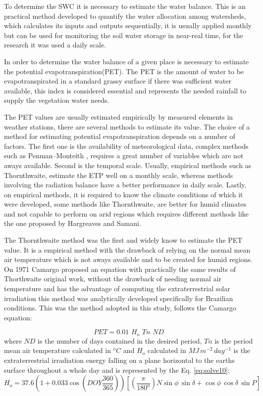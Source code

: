 To determine the SWC it is necessary to estimate the water balance. This is an practical method developed to quantify the water allocation among watersheds, which calculates its inputs and outputs sequentially, it is usually applied monthly but can be used for monitoring the soil water storage in near-real time\cite{thornthwaite1957instructions}, for the research it was used a daily scale.

In order to determine the water balance of a given place is necessary to estimate the potential evapotranspiration(PET). The PET is the amount of water to be evapotranspirated in a standard grassy surface if there was sufficient water available, this index is considered essential and represents the needed rainfall to supply the vegetation water needs\cite{de2000revisao}.

The PET values are usually estimated empirically by measured elements in weather stations, there are several methods to estimate its value. The choice of a method for estimating potential evapotranspiration depends on a number of factors. The first one is the availability of meteorological data, complex methods such as Penman–Monteith \cite{allen1998crop}, requires a great number of variables which are not aways available. Second is the temporal scale. Usually, empirical methods such as Thornthwaite, estimate the ETP well on a monthly scale, whereas methods involving the radiation balance have a better performance in daily scale. Lastly, on empirical methods, it is required to know the climate conditions of which it were developed, some methods like Thornthwaite, are better for humid climates and not capable to perform on arid regions which requires different methods like the one proposed by Hargreaves and Samani\cite{hargreaves1985reference}.

The Thornthwaite method \cite{thornthwaite1948approach} was the first and widely know to estimate the PET value. It is a empirical method with the drawback of relying on the normal mean air temperature which is not aways available and to be created for humid regions. On 1971 Camargo\cite{camargo1971paulo} proposed an equation with practically the same results of Thorthwaite original work, without the drawback of needing normal air temperature and has the advantage of computing the extraterrestrial solar irradiation this method was analytically developed specifically for Brazilian conditions. This was the method adopted in this study, follows the Camargo equation:

\begin{equation}
\label{eq:solve9}
PET = 0.01 \,\, H_o \,\, Tn \,\, ND
\end{equation}
where $ND$ is the number of days contained in the desired period, $Tn$ is the period mean air temperature calculated in $^oC$ and $H_o$ calculated in ${MJ} \, m^{-2} \, day^{-1} $ is the extraterrestrial
irradiation energy falling on a plane horizontal to the earths surface throughout a whole day and is represented by the Eq. \ref{eq:solve10}:
\begin{equation}
\label{eq:solve10}
H_o = 37.6(1 + 0.033\cos(DOY\frac{360}{365}))[(\frac{\pi}{180^o}){N} \sin\phi \, \sin\delta + \cos\phi \, \cos\delta \, \sin P]
\end{equation}

